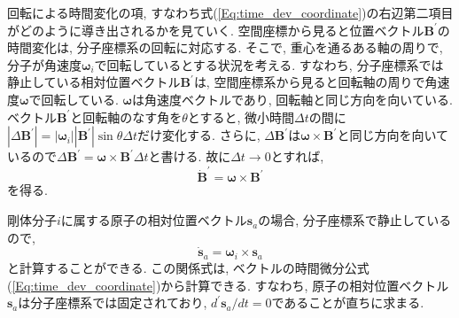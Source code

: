 回転による時間変化の項, すなわち式(\ref{Eq:time_dev_coordinate})の右辺第二項目がどのように導き出されるかを見ていく.
空間座標から見ると位置ベクトル$\bm{B}^{\prime}$の時間変化は, 分子座標系の回転に対応する. 
そこで, 重心を通るある軸の周りで, 分子が角速度$\bm{\omega}_{i}$で回転しているとする状況を考える.
すなわち, 分子座標系では静止している相対位置ベクトル$\bm{B}^{\prime}$は, 空間座標系から見ると回転軸の周りで角速度$\bm{\omega}$で回転している.
$\bm{\omega}$は角速度ベクトルであり, 回転軸と同じ方向を向いている.
ベクトル$\bm{B}^{\prime}$と回転軸のなす角を$\theta$とすると, 微小時間$\Delta t$の間に$|\Delta \bm{B}^{\prime}| =|\bm{\omega}_{i}| |\bm{B}^{\prime}| \sin \theta \Delta t$だけ変化する. さらに, $\Delta \bm{B}^{\prime}$は$\bm{\omega} \times \bm{B}^{\prime}$と同じ方向を向いているので$\Delta \bm{B}^{\prime} = \bm{\omega} \times \bm{B}^{\prime} \Delta t$と書ける. 故に$\Delta t \to 0$とすれば,
\begin{equation}
  \dot{\bm{B}}^{\prime}
  =
  \bm{\omega} \times \bm{B}^{\prime}
\end{equation}
を得る.

剛体分子$i$に属する原子の相対位置ベクトル$\bm{s}_{a}$の場合, 分子座標系で静止しているので,
\begin{equation}
  \dot{\bm{s}}_{a}
  =
  \bm{\omega}_{i} \times \bm{s}_{a}
  \label{Eq:dots_omega_x_s}
\end{equation}
と計算することができる.
この関係式は, ベクトルの時間微分公式(\ref{Eq:time_dev_coordinate})から計算できる.
すなわち, 原子の相対位置ベクトル$\bm{s}_{a}$は分子座標系では固定されており, $d^{\prime}\bm{s}_{a}/dt = 0$であることが直ちに求まる.


